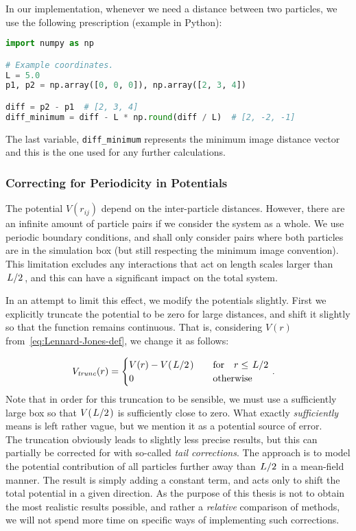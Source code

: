 \documentclass[Thesis.tex]{subfiles}
\begin{document}
In our implementation, whenever we need a distance between two particles, we use
the following prescription (example in Python):

\begin{lstlisting}[language=Python]
import numpy as np

# Example coordinates.
L = 5.0
p1, p2 = np.array([0, 0, 0]), np.array([2, 3, 4])

diff = p2 - p1  # [2, 3, 4]
diff_minimum = diff - L * np.round(diff / L)  # [2, -2, -1]
\end{lstlisting}
The last variable, \texttt{diff\_minimum} represents the minimum image distance
vector and this is the one used for any further calculations.

\subsubsection{Correcting for Periodicity in Potentials}

The potential $V(r_{ij})$ depend on the inter-particle distances. However,
there are an infinite amount of particle pairs if we consider the system as a
whole. We use periodic boundary conditions, and shall only consider pairs where
both particles are in the simulation box (but still respecting the minimum image
convention). This limitation excludes any interactions that act on length scales
larger than $\flatfrac{L}{2}$, and this can have a significant impact on the
total system.

In an attempt to limit this effect, we modify the potentials slightly. First we
explicitly truncate the potential to be zero for large distances, and shift it
slightly so that the function remains continuous. That is, considering $V(r)$
from~\cref{eq:Lennard-Jones-def}, we change it as follows:

\begin{align}
  \label{eq:Lennard-Jones-truncated-def}
  V_\mathit{trunc}(r) &=
                          \begin{cases}
                            V(r) - V(\flatfrac{L}{2}) & \qfor r \leq \flatfrac{L}{2}\\
                            0 & \qotherwise
                          \end{cases}.
\end{align}
Note that in order for this truncation to be sensible, we must use a
sufficiently large box so that $V(\flatfrac{L}{2})$ is sufficiently close to
zero. What exactly \emph{sufficiently} means is left rather vague, but we
mention it as a potential source of error.\\

The truncation obviously leads to slightly less precise results, but this can
partially be corrected for with so-called \emph{tail corrections}. The approach
is to model the potential contribution of all particles further away than
$\flatfrac{L}{2}$ in a mean-field manner. The result is simply adding a constant
term, and acts only to shift the total potential in a given direction. As the
purpose of this thesis is not to obtain the most realistic results possible, and
rather a \emph{relative} comparison of methods, we will not spend more time on
specific ways of implementing such corrections.
\end{document}
